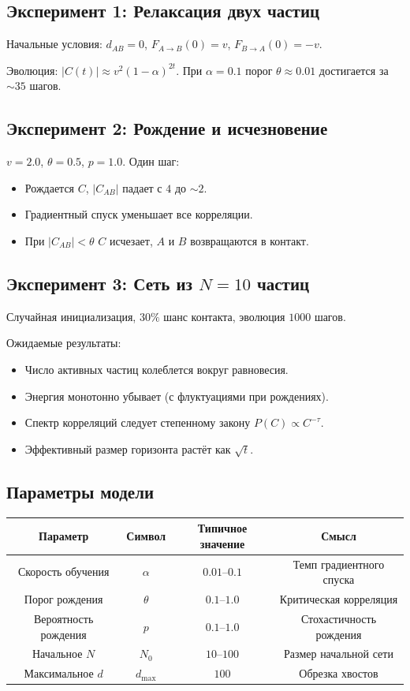 \documentclass[11pt,a4paper]{article}
\theoremstyle{definition}
\begin{document}
\subsection{Эксперимент 1: Релаксация двух частиц}

Начальные условия: $d_{AB} = 0$, $F_{A \to B}(0) = v$, $F_{B \to A}(0) = -v$.

Эволюция: $|C(t)| \approx v^2 (1 - \alpha)^{2t}$. При $\alpha = 0.1$ порог $\theta \approx 0.01$ достигается за $\sim 35$ шагов.

\subsection{Эксперимент 2: Рождение и исчезновение}

$v = 2.0$, $\theta = 0.5$, $p = 1.0$. Один шаг:
\begin{itemize}
    \item Рождается $C$, $|C_{AB}|$ падает с $4$ до $\sim 2$.
    \item Градиентный спуск уменьшает все корреляции.
    \item При $|C_{AB}| < \theta$ $C$ исчезает, $A$ и $B$ возвращаются в контакт.
\end{itemize}

\subsection{Эксперимент 3: Сеть из $N=10$ частиц}

Случайная инициализация, $30\%$ шанс контакта, эволюция $1000$ шагов.

Ожидаемые результаты:
\begin{itemize}
    \item Число активных частиц колеблется вокруг равновесия.
    \item Энергия монотонно убывает (с флуктуациями при рождениях).
    \item Спектр корреляций следует степенному закону $P(C) \propto C^{-\tau}$.
    \item Эффективный размер горизонта растёт как $\sqrt{t}$.
\end{itemize}

\subsection{Параметры модели}

\begin{center}
\begin{tabular}{c|c|c|c}
Параметр & Символ & Типичное значение & Смысл \\
\hline
Скорость обучения & $\alpha$ & $0.01$--$0.1$ & Темп градиентного спуска \\
Порог рождения & $\theta$ & $0.1$--$1.0$ & Критическая корреляция \\
Вероятность рождения & $p$ & $0.1$--$1.0$ & Стохастичность рождения \\
Начальное $N$ & $N_0$ & $10$--$100$ & Размер начальной сети \\
Максимальное $d$ & $d_{\max}$ & $100$ & Обрезка хвостов
\end{tabular}
\end{center}
\end{document}
